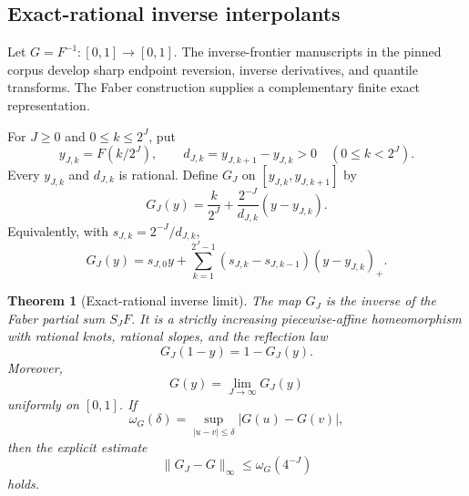 \documentclass[11pt,oneside]{article}
\newtheorem{theorem}{Theorem}[section]
\theoremstyle{definition}
\theoremstyle{remark}
\newcommand{\1}{\mathbf 1}
\begin{document}
\subsection{Exact-rational inverse interpolants}

Let $G=F^{-1}:[0,1]\to[0,1]$.  The inverse-frontier manuscripts in the
pinned corpus develop sharp endpoint reversion, inverse derivatives, and
quantile transforms.  The Faber construction supplies a complementary
finite exact representation.

For $J\ge0$ and $0\le k\le2^J$, put
\begin{equation}
 y_{J,k}=F(k/2^J),
 \qquad
 d_{J,k}=y_{J,k+1}-y_{J,k}>0
 \quad(0\le k<2^J).                                  \label{eq:inverse-knots}
\end{equation}
Every $y_{J,k}$ and $d_{J,k}$ is rational.  Define $G_J$ on
$[y_{J,k},y_{J,k+1}]$ by
\begin{equation}
 G_J(y)=\frac{k}{2^J}
 +\frac{2^{-J}}{d_{J,k}}(y-y_{J,k}).                   \label{eq:inverse-piecewise}
\end{equation}
Equivalently, with $s_{J,k}=2^{-J}/d_{J,k}$,
\begin{equation}
 G_J(y)=s_{J,0}y+
 \sum_{k=1}^{2^J-1}(s_{J,k}-s_{J,k-1})(y-y_{J,k})_+.  \label{eq:inverse-hinge}
\end{equation}

\begin{theorem}[Exact-rational inverse limit]
\label{thm:inverse-faber-limit}
The map $G_J$ is the inverse of the Faber partial sum $S_JF$.  It is a
strictly increasing piecewise-affine homeomorphism with rational knots,
rational slopes, and the reflection law
\begin{equation}
 G_J(1-y)=1-G_J(y).                                      \label{eq:inverse-interpolant-symmetry}
\end{equation}
Moreover,
\begin{equation}
 \boxed{\displaystyle
 G(y)=\lim_{J\to\infty}G_J(y)}                       \label{eq:inverse-faber-limit}
\end{equation}
uniformly on $[0,1]$.  If
\begin{equation}
 \omega_G(\delta)=
 \sup_{|u-v|\le\delta}|G(u)-G(v)|,                  \label{eq:inverse-modulus}
\end{equation}
then the explicit estimate
\begin{equation}
 \boxed{\displaystyle
 \|G_J-G\|_\infty\le\omega_G(4^{-J})}             \label{eq:inverse-faber-error}
\end{equation}
holds.
\end{theorem}
\end{document}
